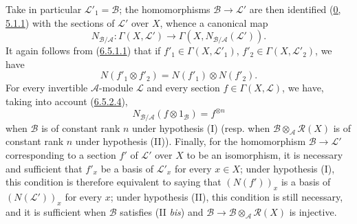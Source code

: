 \begin{env}[6.5.3]
Take in particular $\mathcal{L}'_1=\mathcal{B}$; the homomorphisms
$\mathcal{B}\to\mathcal{L}'$ are then identified
(\hyperref[0.5.1.1]{0, 5.1.1}) with the sections of $\mathcal{L}'$ over
$X$, whence a canonical map
\[
N_{\mathcal{B}/\mathcal{A}}:\Gamma(X,\mathcal{L}')
\to\Gamma(X,N_{\mathcal{B}/\mathcal{A}}(\mathcal{L}')).
\]
It again follows from (\hyperref[II.6.5.1.1]{6.5.1.1}) that if
$f'_1\in\Gamma(X,\mathcal{L}'_1)$, $f'_2\in\Gamma(X,\mathcal{L}'_2)$, we
have
\[
\label{II.6.5.3.1}
N(f'_1\otimes f'_2)=N(f'_1)\otimes N(f'_2).
\tag{6.5.3.1}
\]
For every invertible $\mathcal{A}$-module $\mathcal{L}$ and every section
$f\in\Gamma(X,\mathcal{L})$, we have, taking into account
(\hyperref[II.6.5.2.4]{6.5.2.4}),
\[
\label{II.6.5.3.2}
N_{\mathcal{B}/\mathcal{A}}(f\otimes1_{\mathcal{B}})=f^{\otimes n}
\tag{6.5.3.2}
\]
when $\mathcal{B}$ is of constant rank $n$ under hypothesis (I) (resp. when
$\mathcal{B}\otimes_{\mathcal{A}}\mathcal{R}(X)$ is of constant rank $n$
under hypothesis (II)). Finally, for the homomorphism
$\mathcal{B}\to\mathcal{L}'$ corresponding to a section $f'$ of
$\mathcal{L}'$ over $X$ to be an isomorphism, it is necessary and sufficient
that $f'_x$ be a basis of $\mathcal{L}'_x$ for every $x\in X$; under
hypothesis (I), this condition is therefore equivalent to saying that
$(N(f'))_x$ is a basis of $(N(\mathcal{L}'))_x$ for every $x$; under
hypothesis (II), this condition is still necessary, and it is sufficient
when $\mathcal{B}$ satisfies (II \emph{bis}) and
$\mathcal{B}\to\mathcal{B}\otimes_{\mathcal{A}}\mathcal{R}(X)$ is injective.
\end{env}

